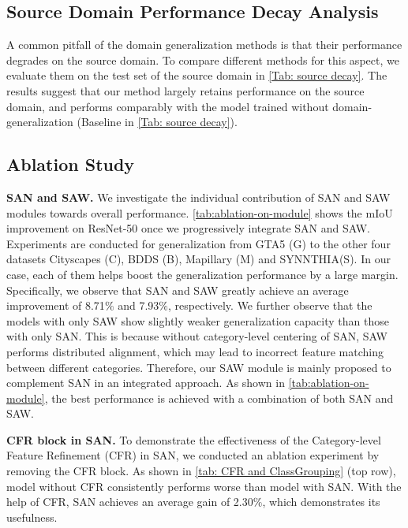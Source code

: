 \documentclass[10pt,twocolumn,letterpaper]{article}
\begin{document}
\subsection{Source Domain Performance Decay Analysis}

A common pitfall of the domain generalization methods is that their performance degrades on the source domain. To compare different methods for this aspect, we evaluate them on the test set of the source domain in \cref{Tab: source decay}. The results suggest that our method largely retains performance on the source domain, and performs comparably with the model trained without domain-generalization (Baseline in \cref{Tab: source decay}). 






\subsection{Ablation Study}

\textbf{SAN and SAW.} We investigate the individual contribution of SAN and SAW modules towards overall performance. \cref{tab:ablation-on-module} shows the mIoU improvement on ResNet-50 once we progressively integrate SAN and SAW. Experiments are conducted for generalization from GTA5 (G) to the other four datasets \ie Cityscapes (C), BDDS (B), Mapillary (M) and SYNNTHIA(S). In our case, each of them helps boost the generalization performance by a large margin. Specifically, we observe that SAN and SAW greatly achieve an average improvement of 8.71$\%$ and 7.93$\%$, respectively. We further observe that the models with only SAW show slightly weaker generalization capacity than those with only SAN. This is because without category-level centering of SAN, SAW performs distributed alignment, which may lead to incorrect feature matching between different categories. Therefore, our SAW module is mainly proposed to complement SAN in an integrated approach. As shown in \cref{tab:ablation-on-module}, the best performance is achieved with a combination of both SAN and SAW. 

\textbf{CFR block in SAN.} To demonstrate the effectiveness of the Category-level Feature Refinement (CFR) in SAN, we conducted an ablation experiment by removing the CFR block. As shown in \cref{tab: CFR and ClassGrouping} (top row), model without CFR consistently performs worse than model with SAN. With the help of CFR, SAN achieves an average gain of 2.30$\%$, which demonstrates its usefulness. 
\end{document}
